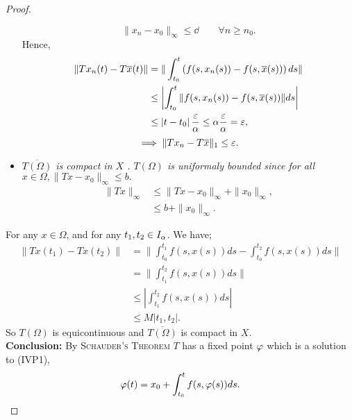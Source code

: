 \begin{proof}
\begin{itemize}
   \[
   \| x_n - x_0 \| _{\infty }\leq  \dd  \quad \quad \forall n \geq n_0.
   \]
   Hence, 
   \begin{align*}
     \| Tx_n (t) - T \overline{x}(t)  \| &=
     \| \int_{t_0}^{t} \left( f(s, x_n (s) ) - f(s, \overline{x}(s) )  \right) ds \| \\
                                         & \leq 
                                         \left| \int_{t_0}^{t} \| f(s, x_n (s) ) - f(s, \overline{x}(s) )  \| ds \right|  
                                         \\
                                         & \leq 
                                         \left| t-t_0 \right|  \frac{\varepsilon }{\alpha} \leq  
                                         \alpha \frac{\varepsilon }{\alpha} = \varepsilon ,
   \end{align*}
   \[
   \implies \| Tx_n - T \overline{x} \| _{1} \leq \varepsilon.
   \]
 \item[\ding{50}] \it $\overline{T(\Omega ) } $ is compact in $X$ \normalfont. $T(\Omega )  $ is uniformaly bounded
   since for all $x \in  \Omega, \| Tx - x_0 \| _{\infty } \leq b.$ 
   \begin{align*}
     \| Tx \| _{\infty } &\leq 
     \| Tx - x_0 \|_{\infty } + \| x_0 \|_{\infty },
     \\
                         & \leq b + \| x_0 \| _{\infty}.
   \end{align*}
\end{itemize}
For any $x \in  \Omega  $, and for any $t_1, t_2 \in  I_{\alpha} $. We have;
\begin{align*}
  \| Tx(t_1) - Tx(t_2)  \| &= \| \int_{t_0}^{t_1} f(s, x(s) ) ds - \int_{t_0}^{t_2}  f(s, x(s) ) ds \| \\
&= \| \int_{t_1}^{t_2} f(s, x(s) ) ds \| \\
& \leq 
\left| \int_{t_1}^{t_2} f(s, x(s) ) ds \right|  \\
& \leq M \left| t_1, t_2 \right|.
\end{align*}
So $T(\Omega )  $ is equicontinuous and $\overline{T(\Omega ) }  $ is compact in $X $. \\
\noindent{} \textbf{Conclusion:} By \textsc{Schauder's Theorem} $T $ has a fixed point 
$\varphi $ which is a solution to (IVP1), 
\[
\varphi(t)  = x_0 + \int_{t_0}^{t}  f(s, \varphi(s) ) ds.
\]
\end{proof}
